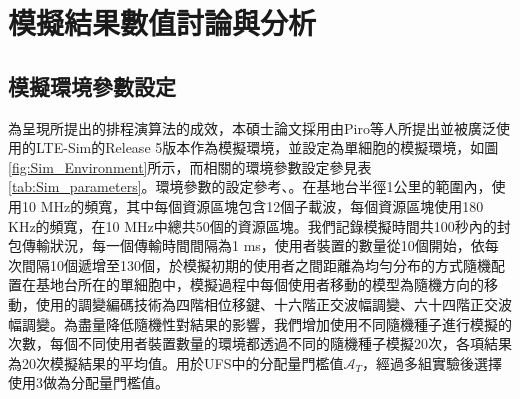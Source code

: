 %
\chapter{模擬結果數值討論與分析}
\section{模擬環境參數設定}
為呈現所提出的排程演算法的成效，本碩士論文採用由Piro等人所提出並被廣泛使用的LTE-Sim\cite{ltesim2011}的Release 5版本作為模擬環境，並設定為單細胞的模擬環境，如圖 \ref{fig:Sim_Environment}所示，而相關的環境參數設定參見表 \ref{tab:Sim_parameters}。環境參數的設定參考\cite{ltesim2011}、\cite{ahme2016}。在基地台半徑1公里的範圍內，使用10 MHz的頻寬，其中每個資源區塊包含12個子載波，每個資源區塊使用180 KHz的頻寬，在10 MHz中總共50個的資源區塊。我們記錄模擬時間共100秒內的封包傳輸狀況，每一個傳輸時間間隔為1 ms，使用者裝置的數量從10個開始，依每次間隔10個遞增至130個，於模擬初期的使用者之間距離為均勻分布的方式隨機配置在基地台所在的單細胞中，模擬過程中每個使用者移動的模型為隨機方向的移動，使用的調變編碼技術為四階相位移鍵、十六階正交波幅調變、六十四階正交波幅調變。為盡量降低隨機性對結果的影響，我們增加使用不同隨機種子進行模擬的次數，每個不同使用者裝置數量的環境都透過不同的隨機種子模擬20次，各項結果為20次模擬結果的平均值。用於UFS中的分配量門檻值$\mathcal{A}_T$，經過多組實驗後選擇使用3做為分配量門檻值。

